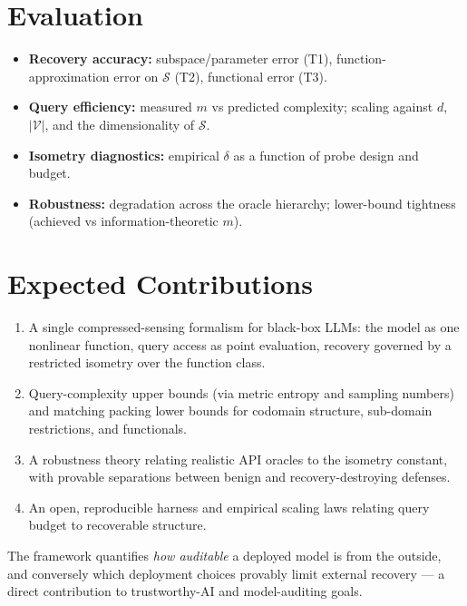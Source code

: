 \documentclass[11pt,a4paper]{article}
\theoremstyle{definition}
\newcommand{\Voc}{\mathcal{V}}
\begin{document}
\section{Evaluation}

\begin{itemize}[leftmargin=*]
  \item \textbf{Recovery accuracy:} subspace/parameter error (T1),
  function-approximation error on $\mathcal{S}$ (T2), functional error (T3).
  \item \textbf{Query efficiency:} measured $m$ vs predicted complexity; scaling
  against $d$, $|\Voc|$, and the dimensionality of $\mathcal{S}$.
  \item \textbf{Isometry diagnostics:} empirical $\delta$ as a function of probe
  design and budget.
  \item \textbf{Robustness:} degradation across the oracle hierarchy; lower-bound
  tightness (achieved vs information-theoretic $m$).
\end{itemize}

\section{Expected Contributions}

\begin{enumerate}[leftmargin=*]
  \item A single compressed-sensing formalism for black-box LLMs: the model as one
  nonlinear function, query access as point evaluation, recovery governed by a
  restricted isometry over the function class.
  \item Query-complexity upper bounds (via metric entropy and sampling numbers)
  and matching packing lower bounds for codomain structure, sub-domain
  restrictions, and functionals.
  \item A robustness theory relating realistic API oracles to the isometry
  constant, with provable separations between benign and recovery-destroying
  defenses.
  \item An open, reproducible harness and empirical scaling laws relating query
  budget to recoverable structure.
\end{enumerate}

The framework quantifies \emph{how auditable} a deployed model is from the
outside, and conversely which deployment choices provably limit external recovery
--- a direct contribution to trustworthy-AI and model-auditing goals.
\end{document}
